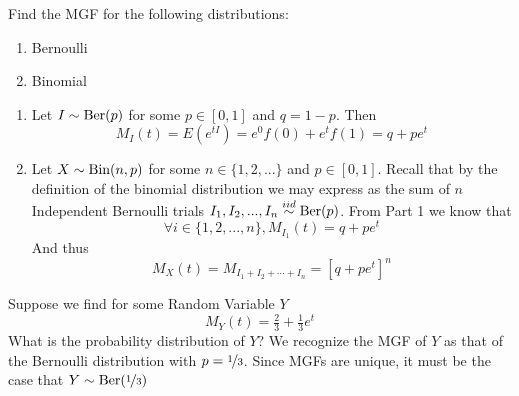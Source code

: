 \documentclass{report}
\begin{document}
\begin{example}
    Find the MGF for the following distributions:
    \begin{enumerate}
        \item Bernoulli
        \item Binomial
    \end{enumerate}
    \solution 
    \begin{enumerate}
        \item Let $I\sim \textup{Ber}(p)$ for some $p\in[0,1]$ and $q=1-p$. Then
        \[
            M_I(t)=E(e^{tI})=e^0 f(0)+ e^t f(1)= q+pe^t
        \]
        \item Let $X\sim\textup{Bin}(n,p)$ for some $n\in\{1,2,...\}$ and $p\in[0,1]$. Recall that by the definition of the binomial distribution we may express as the sum of $n$ Independent Bernoulli trials $I_1,I_2,...,I_n\overset{iid}\sim\textup{Ber}(p)$. From Part 1 we know that
        \[
            \forall i\in\{1,2,...,n\}, M_{I_1}(t)=q+pe^t
        \]
        And thus
        \[
            M_X(t)=M_{I_1+I_2+\cdots+I_n}=\left[q+pe^t\right]^n
        \]
    \end{enumerate}
\end{example}

\begin{example}
        Suppose we find for some Random Variable $Y$
        \[
            M_Y(t)=\tfrac 23 + \tfrac 13 e^t
        \]
        What is the probability distribution of $Y$?
        \solution
        We recognize the MGF of $Y$ as that of the Bernoulli distribution with $p=\nicefrac 13$. Since MGFs are unique, it must be the case that $Y\sim\textup{Ber}(\nicefrac 13)$
\end{example}
\end{document}
